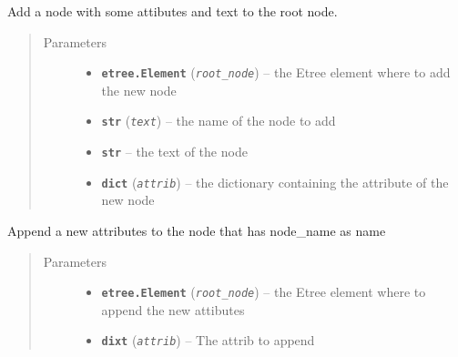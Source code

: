 \documentclass[a4paper,10pt,english]{sphinxmanual}
\begin{document}

\begin{fulllineitems}
\label{commands/apidoc/src:src.xmlManager.add_simple_node}
Add a node with some attibutes and text to the root node.
\begin{quote}\begin{description}
\item[{Parameters}] \leavevmode\begin{itemize}
\item {} 
\textbf{\texttt{etree.Element}} (\emph{\texttt{root\_node}}) -- the Etree element where to add the new node

\item {} 
\textbf{\texttt{str}} (\emph{\texttt{text}}) -- the name of the node to add

\item {} 
\textbf{\texttt{str}} -- the text of the node

\item {} 
\textbf{\texttt{dict}} (\emph{\texttt{attrib}}) -- the dictionary containing the 
attribute of the new node

\end{itemize}

\end{description}\end{quote}

\end{fulllineitems}


\begin{fulllineitems}
\label{commands/apidoc/src:src.xmlManager.append_node_attrib}
Append a new attributes to the node that has node\_name as name
\begin{quote}\begin{description}
\item[{Parameters}] \leavevmode\begin{itemize}
\item {} 
\textbf{\texttt{etree.Element}} (\emph{\texttt{root\_node}}) -- the Etree element 
where to append the new attibutes

\item {} 
\textbf{\texttt{dixt}} (\emph{\texttt{attrib}}) -- The attrib to append

\end{itemize}

\end{description}\end{quote}

\end{fulllineitems}
\end{document}
